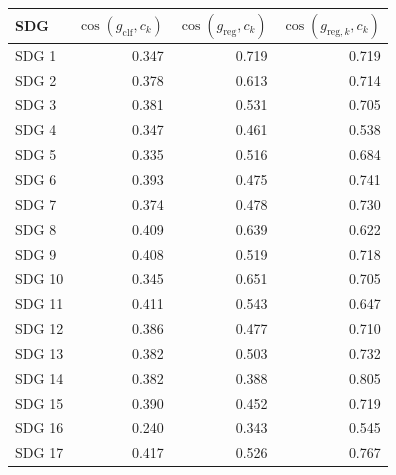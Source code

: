 \begin{tabular}{lrrr}
\toprule
SDG & $\cos(g_{\mathrm{clf}}, c_k)$ & $\cos(g_{\mathrm{reg}}, c_k)$ & $\cos(g_{\mathrm{reg},k}, c_k)$ \\
\midrule
SDG 1 & 0.347 & 0.719 & 0.719 \\
SDG 2 & 0.378 & 0.613 & 0.714 \\
SDG 3 & 0.381 & 0.531 & 0.705 \\
SDG 4 & 0.347 & 0.461 & 0.538 \\
SDG 5 & 0.335 & 0.516 & 0.684 \\
SDG 6 & 0.393 & 0.475 & 0.741 \\
SDG 7 & 0.374 & 0.478 & 0.730 \\
SDG 8 & 0.409 & 0.639 & 0.622 \\
SDG 9 & 0.408 & 0.519 & 0.718 \\
SDG 10 & 0.345 & 0.651 & 0.705 \\
SDG 11 & 0.411 & 0.543 & 0.647 \\
SDG 12 & 0.386 & 0.477 & 0.710 \\
SDG 13 & 0.382 & 0.503 & 0.732 \\
SDG 14 & 0.382 & 0.388 & 0.805 \\
SDG 15 & 0.390 & 0.452 & 0.719 \\
SDG 16 & 0.240 & 0.343 & 0.545 \\
SDG 17 & 0.417 & 0.526 & 0.767 \\
\bottomrule
\end{tabular}
